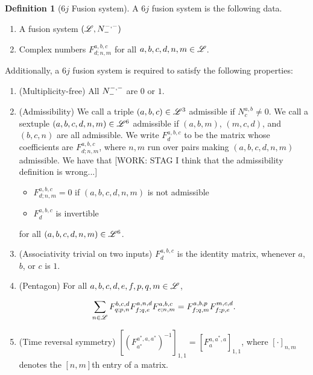 \documentclass{article}
\theoremstyle{definition}
\newtheorem*{definition}{Definition}
\numberwithin{figure}{section}
\begin{document}
\begin{definition}[$6j$ Fusion system] A $6j$ fusion system is the following data.

\begin{enumerate}
\item A fusion system $(\mathscr{L}, N_{\--}^{\--,\--})$
\item Complex numbers $F^{a,b,c}_{d;n,m}$ for all $a,b,c,d,n,m\in \mathscr{L}$.
\end{enumerate} 

Additionally, a $6j$ fusion system is required to satisfy the following properties:

\begin{enumerate}

\item (Multiplicity-free) All $N^{\--,\--}_{\--}$ are $0$ or $1$.

\item (Admissibility) We call a triple $(a,b,c)\in \mathscr{L}^3$ admissible if $N^{a,b}_c\neq 0$. We call a sextuple $(a,b,c,d,n,m)\in \mathscr{L}^6$ admissible if $(a,b,m)$, $(m,c,d)$, and $(b,c,n)$ are all admissible. We write $F^{a,b,c}_{d}$ to be the matrix whose coefficients are $F^{a,b,c}_{d;n,m}$, where $n,m$ run over pairs making $(a,b,c,d,n,m)$ admissible. We have that [WORK: STAG I think that the admissibility definition is wrong...]

\begin{itemize}
\item $F^{a,b,c}_{d;n,m}=0$ if $(a,b,c,d,n,m)$ is not admissible
\item $F^{a,b,c}_{d}$ is invertible
\end{itemize}

for all $(a,b,c,d,n,m)\in \mathscr{L}^6$.

\item (Associativity trivial on two inputs) $F^{a,b,c}_{d}$ is the identity matrix, whenever $a$, $b$, or $c$ is $1$.

\item (Pentagon) For all $a,b,c,d,e,f,p,q,m\in\mathscr{L}$,

$$\sum_{n\in \mathscr{L}}F^{b,c,d}_{q;p,n}F^{a,n,d}_{f;q,e}F^{a,b,c}_{e;n,m}=F^{a,b,p}_{f; q,m}F^{m,c,d}_{f;p,e}.$$

\item (Time reversal symmetry) $\left[\left(F^{a^*,a,a^*}_{a^*}\right)^{-1}\right]_{1,1}=\left[F^{a,a^*,a}_{a}\right]_{1,1}$, where $\left[\cdot\right]_{n,m}$ denotes the $[n,m]$th entry of a matrix.
\end{enumerate}
\raggedleft\qedsymbol{}
\end{definition}
\end{document}
